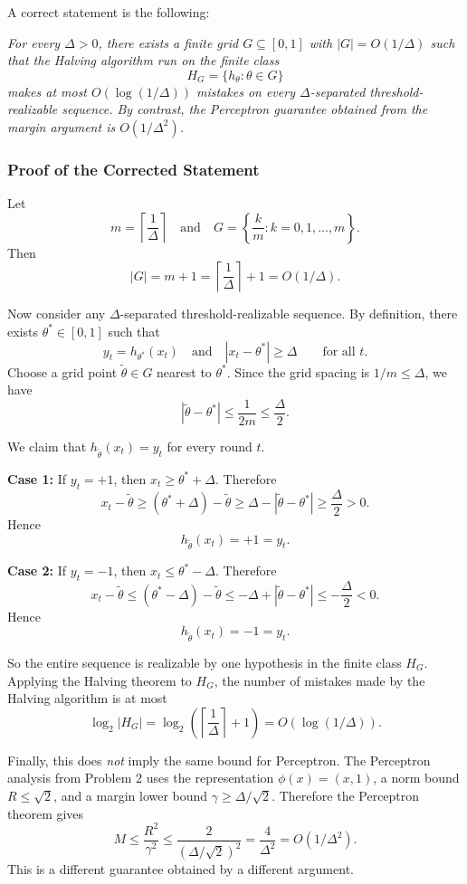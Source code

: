 \documentclass{article}
\begin{document}
A correct statement is the following:

\medskip

\emph{For every $\Delta > 0$, there exists a finite grid $G \subseteq [0,1]$ with
$|G| = O(1/\Delta)$ such that the Halving algorithm run on the finite class
$$
H_G = \{h_\theta : \theta \in G\}
$$
makes at most $O(\log(1/\Delta))$ mistakes on every $\Delta$-separated threshold-realizable
sequence. By contrast, the Perceptron guarantee obtained from the margin argument is
$O(1/\Delta^2)$.}

\subsubsection{Proof of the Corrected Statement}

Let
$$
m = \left\lceil \frac{1}{\Delta} \right\rceil
\quad \text{and} \quad
G = \left\{ \frac{k}{m} : k = 0,1,\dots,m \right\}.
$$
Then
$$
|G| = m+1 = \left\lceil \frac{1}{\Delta} \right\rceil + 1 = O(1/\Delta).
$$

Now consider any $\Delta$-separated threshold-realizable sequence. By definition, there exists
$\theta^* \in [0,1]$ such that
$$
y_t = h_{\theta^*}(x_t)
\quad \text{and} \quad
|x_t-\theta^*| \geq \Delta
\qquad \text{for all } t.
$$
Choose a grid point $\widetilde{\theta} \in G$ nearest to $\theta^*$. Since the grid spacing is
$1/m \leq \Delta$, we have
$$
|\widetilde{\theta}-\theta^*| \leq \frac{1}{2m} \leq \frac{\Delta}{2}.
$$

We claim that $h_{\widetilde{\theta}}(x_t)=y_t$ for every round $t$.

\textbf{Case 1: } If $y_t=+1$, then $x_t \geq \theta^*+\Delta$. Therefore
$$
x_t-\widetilde{\theta}
\geq (\theta^*+\Delta)-\widetilde{\theta}
\geq \Delta-|\widetilde{\theta}-\theta^*|
\geq \frac{\Delta}{2}
> 0.
$$
Hence
$$
h_{\widetilde{\theta}}(x_t)=+1=y_t.
$$

\textbf{Case 2: } If $y_t=-1$, then $x_t \leq \theta^*-\Delta$. Therefore
$$
x_t-\widetilde{\theta}
\leq (\theta^*-\Delta)-\widetilde{\theta}
\leq -\Delta+|\widetilde{\theta}-\theta^*|
\leq -\frac{\Delta}{2}
< 0.
$$
Hence
$$
h_{\widetilde{\theta}}(x_t)=-1=y_t.
$$

So the entire sequence is realizable by one hypothesis in the finite class $H_G$. Applying the
Halving theorem to $H_G$, the number of mistakes made by the Halving algorithm is at most
$$
\log_2 |H_G|
= \log_2 \left( \left\lceil \frac{1}{\Delta} \right\rceil + 1 \right)
= O(\log(1/\Delta)).
$$

Finally, this does \emph{not} imply the same bound for Perceptron. The Perceptron analysis from
Problem 2 uses the representation $\phi(x)=(x,1)$, a norm bound $R \leq \sqrt{2}$, and a margin
lower bound $\gamma \geq \Delta/\sqrt{2}$. Therefore the Perceptron theorem gives
$$
M \leq \frac{R^2}{\gamma^2}
\leq \frac{2}{(\Delta/\sqrt{2})^2}
= \frac{4}{\Delta^2}
= O(1/\Delta^2).
$$
This is a different guarantee obtained by a different argument.
\end{document}
